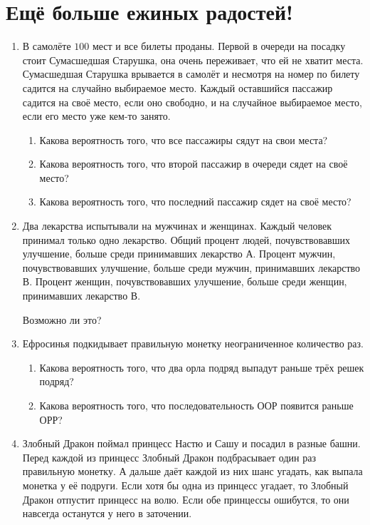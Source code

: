 \documentclass[12pt]{article}
\begin{document}
\section{Ещё больше ежиных радостей!}
\begin{enumerate}
\item В самолёте $100$ мест и все билеты проданы.
Первой в очереди на посадку стоит Сумасшедшая Старушка,
она очень переживает, что ей не хватит места.
Сумасшедшая Старушка врывается в самолёт
и несмотря на номер по билету садится на случайно выбираемое место.
Каждый оставшийся пассажир садится на своё место, если оно свободно,
и на случайное выбираемое место, если его место уже кем-то занято.

\begin{enumerate}
\item Какова вероятность того, что все пассажиры сядут на свои места?
\item Какова вероятность того, что второй пассажир в очереди сядет на своё место?
\item Какова вероятность того, что последний пассажир сядет на своё место?
\end{enumerate}

\item Два лекарства испытывали на мужчинах и женщинах. Каждый
человек принимал только одно лекарство. Общий процент людей,
почувствовавших улучшение, больше среди принимавших лекарство А.
Процент мужчин, почувствовавших улучшение, больше среди мужчин, принимавших лекарство В.
Процент женщин, почувствовавших улучшение, больше среди женщин, принимавших лекарство В.

Возможно ли это?

\item Ефросинья подкидывает правильную монетку неограниченное количество раз.
\begin{enumerate}
    \item Какова вероятность того, что два орла подряд выпадут раньше трёх решек подряд?
    \item Какова вероятность того, что последовательность ООР появится раньше ОРР? 
\end{enumerate}


\item Злобный Дракон поймал принцесс Настю и Сашу и посадил в разные башни.
Перед каждой из принцесс Злобный Дракон подбрасывает один раз правильную монетку.
А дальше даёт каждой из них шанс угадать, как выпала монетка у её подруги.
Если хотя бы одна из принцесс угадает, то Злобный Дракон отпустит принцесс на волю.
Если обе принцессы ошибутся, то они навсегда останутся у него в заточении.


\end{enumerate}
\end{document}
